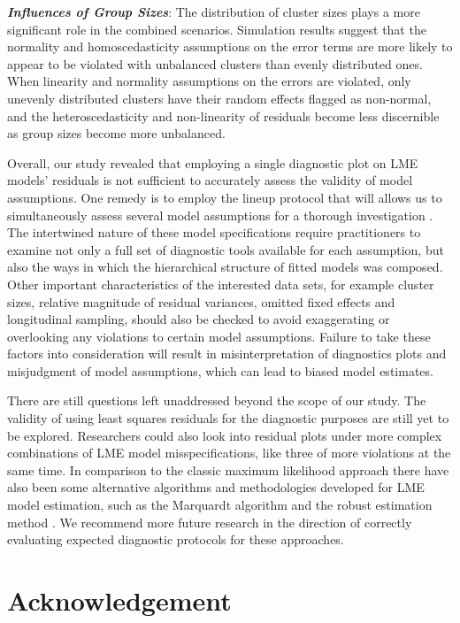 \documentclass[12pt]{article}
\begin{document}
\textbf{\emph{Influences of Group Sizes}}: The distribution of cluster
sizes plays a more significant role in the combined scenarios.
Simulation results suggest that the normality and homoscedasticity
assumptions on the error terms are more likely to appear to be violated
with unbalanced clusters than evenly distributed ones. When linearity
and normality assumptions on the errors are violated, only unevenly
distributed clusters have their random effects flagged as non-normal,
and the heteroscedasticity and non-linearity of residuals become less
discernible as group sizes become more unbalanced.

Overall, our study revealed that employing a single diagnostic plot on
LME models' residuals is not sufficient to accurately assess the
validity of model assumptions. One remedy is to employ the lineup
protocol that will allows us to simultaneously assess several model
assumptions for a thorough investigation \citep{Loy2017-fo}. The
intertwined nature of these model specifications require practitioners
to examine not only a full set of diagnostic tools available for each
assumption, but also the ways in which the hierarchical structure of
fitted models was composed. Other important characteristics of the
interested data sets, for example cluster sizes, relative magnitude of
residual variances, omitted fixed effects and longitudinal sampling,
should also be checked to avoid exaggerating or overlooking any
violations to certain model assumptions. Failure to take these factors
into consideration will result in misinterpretation of diagnostics plots
and misjudgment of model assumptions, which can lead to biased model
estimates.

There are still questions left unaddressed beyond the scope of our
study. The validity of using least squares residuals for the diagnostic
purposes are still yet to be explored. Researchers could also look into
residual plots under more complex combinations of LME model
misspecifications, like three of more violations at the same time. In
comparison to the classic maximum likelihood approach there have also
been some alternative algorithms and methodologies developed for LME
model estimation, such as the Marquardt algorithm
\citep{proust2005estimation} and the robust estimation method
\citep{koller2016robustlmm}. We recommend more future research in the
direction of correctly evaluating expected diagnostic protocols for
these approaches.

\hypertarget{acknowledgement}{%
\section{Acknowledgement}\label{acknowledgement}}
\end{document}
